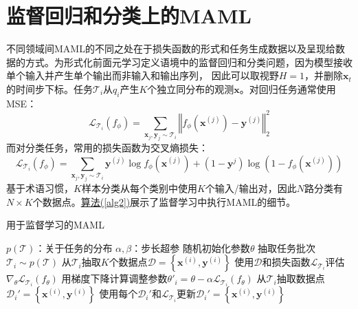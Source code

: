 \documentclass[11pt,twoside,a4paper]{ctexart}
\begin{document}
\section{监督回归和分类上的MAML}
不同领域间MAML的不同之处在于损失函数的形式和任务生成数据以及呈现给数据的方式。为形式化前面元学习定义语境中的监督回归和分类问题，因为模型接收单个输入并产生单个输出而非输入和输出序列，
因此可以取视野$H=1$，并删除$\mathbf x_t$的时间步下标。任务$\mathcal T_i$从$q_i$产生$K$个独立同分布的观测$\mathbf x$。对回归任务通常使用MSE：
\begin{equation}
	\mathcal{L}_{\mathcal{T}_i}\left(f_\phi\right) = \sum_{\mathbf{x}_j,\mathbf{y}_j\sim\mathcal{T}_i} \left\Vert f_\phi\left(\mathbf x^{(j)}\right)-\mathbf{y}^{(j)} \right\Vert_2^2
\end{equation}
而对分类任务，常用的损失函数为交叉熵损失：
\begin{equation}
	\mathcal{L}_{\mathcal{T}_i}\left(f_\phi\right) = \sum_{\mathbf{x}_j,\mathbf{y}_j\sim\mathcal{T}_i} \mathbf{y}^{(j)}\log f_\phi\left(\mathbf{x}^{(j)}\right)
	+ \left(1-\mathbf{y}^{j}\right)\log\left(1-f_\phi\left(\mathbf{x}^{(j)}\right)\right)
\end{equation}
基于术语习惯，$K$样本分类从每个类别中使用$K$个输入/输出对，因此$N$路分类有$N\times K$个数据点。\hyperref[alg2]{算法(\ref{alg2})}展示了监督学习中执行MAML的细节。
\begin{algorithm}
	\caption{用于监督学习的MAML}
	\label{alg2}
	\begin{algorithmic}[1]
		\Require $p(\mathcal T)$：关于任务的分布
		\Require $\alpha,\beta$：步长超参
		\State 随机初始化参数$\theta$
			\State 抽取任务批次$\mathcal T_i \sim p(\mathcal T)$
				\State 从$\mathcal{T}_i$抽取$K$个数据点$\mathcal D=\left\{\mathbf{x}^{(i)},\mathbf{y}^{(i)}\right\}$
				\State 使用$\mathcal D$和损失函数$\mathcal{L}_{\mathcal{T}_i}$评估$\nabla_\theta\mathcal L_{\mathcal T_i}\left( f_\theta \right)$
				\State 用梯度下降计算调整参数$\theta'_i=\theta-\alpha\mathcal{L}_{\mathcal{T}_i}\left( f_\theta \right)$
				\State 从$\mathcal{T}_i$抽取数据点$\mathcal D_i'=\left\{\mathbf{x}^{(i)},\mathbf{y}^{(i)}\right\}$
			\EndFor
			\State 使用每个$\mathcal D_i'$和$\mathcal{L}_{\mathcal{T}_i}$更新$\mathcal D_i'=\left\{\mathbf{x}^{(i)},\mathbf{y}^{(i)}\right\}$
		\EndWhile
	\end{algorithmic}
\end{algorithm}
\end{document}
